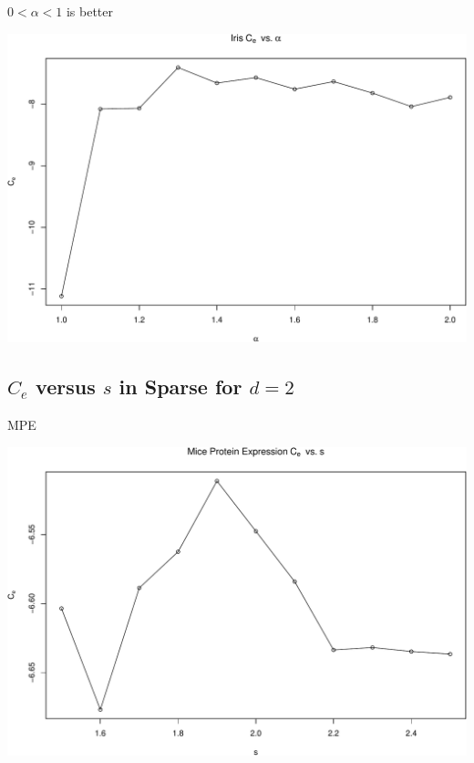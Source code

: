 \documentclass[ignorenonframetext,]{beamer}
\begin{document}
\begin{frame}{\(0<\alpha<1\) is better}

\begin{center}\includegraphics[width=1\linewidth]{Presentation_files/figure-beamer/unnamed-chunk-25-1} \end{center}

\end{frame}

\subsection{\texorpdfstring{\(C_e\) versus \(s\) in Sparse for
\(d = 2\)}{C\_e versus s in Sparse for d = 2}}\label{c_e-versus-s-in-sparse-for-d-2}

\begin{frame}{MPE}

\begin{center}\includegraphics[width=1\linewidth]{Presentation_files/figure-beamer/unnamed-chunk-27-1} \end{center}

\end{frame}
\end{document}
